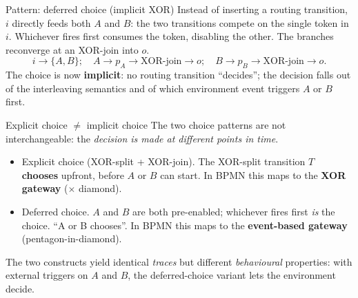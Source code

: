 \begin{examplebox}{Pattern: deferred choice (implicit XOR)}
Instead of inserting a routing transition, $i$ directly feeds both $A$ and $B$: the two transitions compete on the single token in $i$. Whichever fires first consumes the token, disabling the other. The branches reconverge at an XOR-join into $o$.
\[
  i \to \{A, B\}; \quad A \to p_A \to \text{XOR-join} \to o; \quad B \to p_B \to \text{XOR-join} \to o.
\]
The choice is now \textbf{implicit}: no routing transition ``decides''; the decision falls out of the interleaving semantics and of which environment event triggers $A$ or $B$ first.
\end{examplebox}

\begin{notebox}{Explicit choice $\neq$ implicit choice}
The two choice patterns are not interchangeable: the \emph{decision is made at different points in time}.

\begin{itemize}
  \item Explicit choice (XOR-split + XOR-join). The XOR-split transition $T$ \textbf{chooses} upfront, before $A$ or $B$ can start. In BPMN this maps to the \textbf{XOR gateway} ($\times$ diamond).
  \item Deferred choice. $A$ and $B$ are both pre-enabled; whichever fires first \emph{is} the choice. ``A or B chooses''. In BPMN this maps to the \textbf{event-based gateway} (pentagon-in-diamond).
\end{itemize}

The two constructs yield identical \emph{traces} but different \emph{behavioural} properties: with external triggers on $A$ and $B$, the deferred-choice variant lets the environment decide.
\end{notebox}

